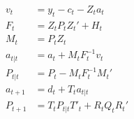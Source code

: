\documentclass{article}
\begin{document}
\begin{align}
  v_{t} &= y_{t} - c_{t} - Z_{t} a_{t} \\
  F_{t} &= Z_{t} P_{t} Z_{t}' + H_{t} \\
  M_{t} &= P_{t} Z_{t} \\
  a_{t|t} &= a_{t} + M_{t} F^{-1}_{t} v_{t} \\
  P_{t|t} &= P_{t} - M_{t} F^{-1}_{t} M_{t}' \\
  a_{t + 1} &= d_{t} + T_{t} a_{t|t} \\
  P_{t + 1} &= T_{t} P_{t|t} T'_{t} + R_{t} Q_{t} R_{t}'
\end{align}
\end{document}
